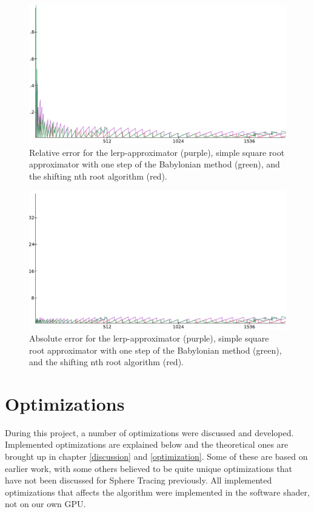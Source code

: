 		\begin{figure}[H]
			\centering
			\includegraphics[width=0.75\linewidth]{figure/rel_lin960x.png} 
			\caption{Relative error for the lerp-approximator (purple), simple 
				square root approximator with one step of the Babylonian method 
				(green), and the shifting nth root algorithm (red).}
			\label{orsqrt2}
		\end{figure}

		\begin{figure}[H]
			\centering
			\includegraphics[width=0.75\linewidth]{figure/abs_lin24x.png} 
			\caption{Absolute error for the lerp-approximator (purple), simple 
				square root approximator with one step of the Babylonian method 
				(green), and the shifting nth root algorithm (red).}
			\label{orsqrt2}
		\end{figure}

	\section{Optimizations}
		
		During this project, a number of optimizations were discussed and
		developed. Implemented optimizations are explained below and the 
		theoretical ones are brought up in chapter \ref{discussion} and 
		\ref{optimization}. Some of these are based on earlier work, with some 
		others believed to be quite unique optimizations that have not been 
		discussed for Sphere Tracing previously. All implemented optimizations 
		that affects the algorithm were implemented in the software shader, not 
		on our own GPU.

